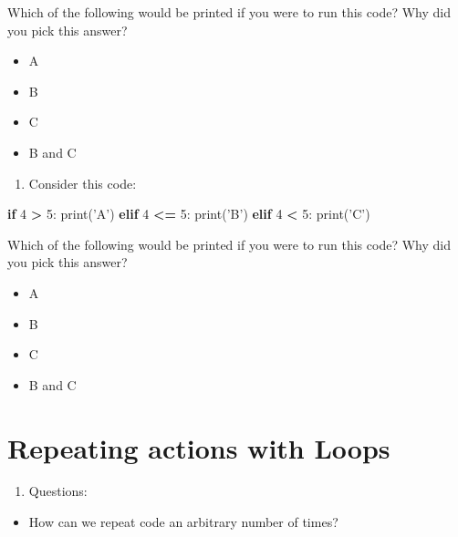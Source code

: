 \documentclass[]{book}
\newenvironment{Shaded}{\begin{snugshade}}{\end{snugshade}}
\newcommand{\BuiltInTok}[1]{#1}
\newcommand{\ControlFlowTok}[1]{\textcolor[rgb]{0.13,0.29,0.53}{\textbf{#1}}}
\newcommand{\DecValTok}[1]{\textcolor[rgb]{0.00,0.00,0.81}{#1}}
\newcommand{\NormalTok}[1]{#1}
\newcommand{\OperatorTok}[1]{\textcolor[rgb]{0.81,0.36,0.00}{\textbf{#1}}}
\newcommand{\StringTok}[1]{\textcolor[rgb]{0.31,0.60,0.02}{#1}}
\providecommand{\tightlist}{%
  \setlength{\itemsep}{0pt}\setlength{\parskip}{0pt}}
\theoremstyle{definition}
\theoremstyle{definition}
\theoremstyle{definition}
\theoremstyle{remark}
\begin{document}
Which of the following would be printed if you were to run this code?
Why did you pick this answer?

\begin{itemize}
\tightlist
\item
  A
\item
  B
\item
  C
\item
  B and C
\end{itemize}

\begin{enumerate}
\def\labelenumi{\arabic{enumi}.}
\setcounter{enumi}{2}
\tightlist
\item
  Consider this code:
\end{enumerate}

\begin{Shaded}
\begin{Highlighting}[]
\ControlFlowTok{if} \DecValTok{4} \OperatorTok{>} \DecValTok{5}\NormalTok{:}
    \BuiltInTok{print}\NormalTok{(}\StringTok{'A'}\NormalTok{)}
\ControlFlowTok{elif} \DecValTok{4} \OperatorTok{<=} \DecValTok{5}\NormalTok{:}
    \BuiltInTok{print}\NormalTok{(}\StringTok{'B'}\NormalTok{)}
\ControlFlowTok{elif} \DecValTok{4} \OperatorTok{<} \DecValTok{5}\NormalTok{:}
    \BuiltInTok{print}\NormalTok{(}\StringTok{'C'}\NormalTok{)}
\end{Highlighting}
\end{Shaded}

Which of the following would be printed if you were to run this code?
Why did you pick this answer?

\begin{itemize}
\tightlist
\item
  A
\item
  B
\item
  C
\item
  B and C
\end{itemize}

\hypertarget{repeating-actions-with-loops}{%
\chapter{Repeating actions with
Loops}\label{repeating-actions-with-loops}}

\begin{enumerate}
\def\labelenumi{\arabic{enumi}.}
\tightlist
\item
  Questions:
\end{enumerate}

\begin{itemize}
\tightlist
\item
  How can we repeat code an arbitrary number of times?
\end{itemize}
\end{document}
